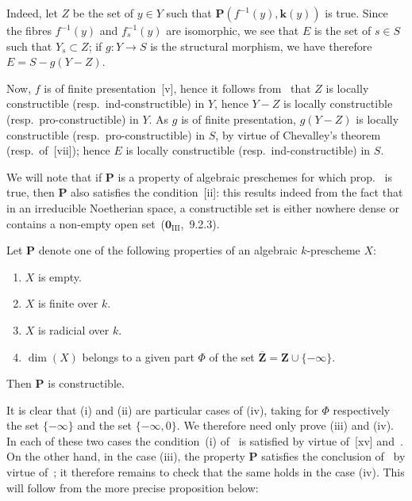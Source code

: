 Indeed, let $Z$ be the set of $y\in Y$ such that $\mathbf{P}(f^{-1}(y),\mathbf{k}(y))$ is true.
Since the fibres $f^{-1}(y)$ and $f_s^{-1}(y)$ are isomorphic, we see that $E$ is the set of $s\in S$ such that $Y_s\subset Z$; if $g:Y\to S$ is the structural morphism, we have therefore $E=S-g(Y-Z)$.


Now, $f$ is of finite presentation~[v], hence it follows from~ that $Z$ is locally constructible (resp.\ ind-constructible) in $Y$, hence $Y-Z$ is locally constructible (resp.\ pro-constructible) in $Y$.
As $g$ is of finite presentation, $g(Y-Z)$ is locally constructible (resp.\ pro-constructible) in $S$, by virtue of Chevalley's theorem~ (resp.\ of~[vii]); hence $E$ is locally constructible (resp.\ ind-constructible) in $S$.

\begin{remark}[9.2.5]
\label{IV.9.2.5}
We will note that if $\mathbf{P}$ is a property of algebraic preschemes for which prop.~ is true, then $\mathbf{P}$ also satisfies the condition~[ii]: this results indeed from the fact that in an irreducible Noetherian space, a constructible set is either nowhere dense or contains a non-empty open set~($\mathbf{0}_{\mathrm{III}}$,~9.2.3).
\end{remark}

\begin{proposition}[9.2.6]
\label{IV.9.2.6}
Let $\mathbf{P}$ denote one of the following properties of an algebraic $k$-prescheme $X$:
\begin{enumerate}[label=(\roman*)]
  \item $X$ is empty.
  \item $X$ is finite over $k$.
  \item $X$ is radicial over $k$.
  \item $\dim(X)$ belongs to a given part $\Phi$ of the set $\overline{\mathbf{Z}}=\mathbf{Z}\cup\{-\infty\}$.
\end{enumerate}
Then $\mathbf{P}$ is constructible.
\end{proposition}

It is clear that (i) and (ii) are particular cases of (iv), taking for $\Phi$ respectively the set $\{-\infty\}$ and the set $\{-\infty,0\}$.
We therefore need only prove (iii) and (iv).
In each of these two cases the condition~(i) of~ is satisfied by virtue of~[xv] and~.
On the other hand, in the case (iii), the property $\mathbf{P}$ satisfies the conclusion of~ by virtue of~; it therefore remains to check that the same holds in the case (iv).
This will follow from the more precise proposition below:


